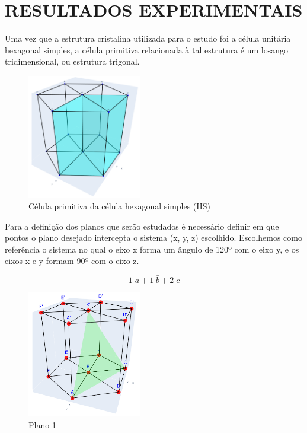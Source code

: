 \documentclass[10pt,twocolumn,letterpaper]{article}
\begin{document}
\vspace{.75cm}

\section{RESULTADOS EXPERIMENTAIS}
\hspace{1cm} Uma vez que a estrutura cristalina utilizada para o estudo foi a célula unitária hexagonal simples, a célula  primitiva relacionada à tal estrutura é um losango tridimensional, ou estrutura trigonal.

\begin{figure}
    \centering
    \includegraphics[width=5cm]{PrimitiveCell.png}
    \caption{Célula primitiva da célula hexagonal simples (HS)}
    \label{fig:label}
\end{figure}

\vspace{1cm}

\hspace{1cm} Para a definição dos planos que serão estudados é necessário definir em que pontos o plano desejado intercepta o sistema (x, y, z) escolhido. Escolhemos como referência o sistema no qual o eixo x forma um ângulo de 120º com o eixo y, e os eixos x e y formam 90º com o eixo z.

\vspace{-0.25cm}

\begin{equation*}
    1\;\bar{a} + 1\;\bar{b} + 2\;\bar{c}
\end{equation*}

\vspace{-0.25cm}

\begin{figure}[h]
    \centering
    \includegraphics[width=5cm]{Plano1.png}
    \caption{Plano 1}
    \label{fig:label}
\end{figure}
\end{document}
